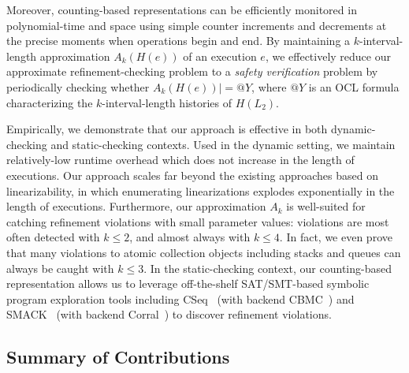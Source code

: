 Moreover, counting-based representations can be efficiently monitored in
polynomial-time and space using simple counter increments and decrements at the
precise moments when operations begin and end. By maintaining a
$k$-interval-length approximation $A_k(H(e))$ of an execution $e$, we
effectively reduce our approximate refinement-checking problem to a
\emph{safety verification} problem by periodically checking whether $A_k(H(e))
|= @Y$, where $@Y$ is an OCL formula characterizing the $k$-interval-length
histories of $H(L_2)$.

Empirically, we demonstrate that our approach is effective in both
dynamic-checking and static-checking contexts. Used in the dynamic setting, we
maintain relatively-low runtime overhead which does not increase in the length
of executions. Our approach scales far beyond the existing approaches based on
linearizability, in which enumerating linearizations explodes exponentially in
the length of executions. Furthermore, our approximation $A_k$ is well-suited
for catching refinement violations with small parameter values: violations are
most often detected with $k \le 2$, and almost always with $k \le 4$. In fact,
we even prove that many violations to atomic collection objects including
stacks and queues can always be caught with $k \le 3$. In the static-checking
context, our counting-based representation allows us to leverage off-the-shelf
SAT/SMT-based symbolic program exploration tools including
CSeq~\cite{conf/ase/FischerIP13} (with backend
CBMC~\cite{conf/tacas/KroeningT14}) and SMACK~\cite{conf/cav/RakamaricE14}
(with backend Corral~\cite{conf/cav/LalQL12}) to discover refinement violations.

\subsection{Summary of Contributions}

